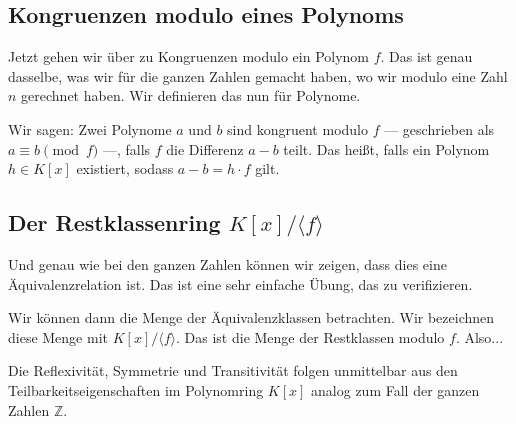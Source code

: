 \subsection{Kongruenzen modulo eines Polynoms}

\begin{spoken-clean}[00:39:47 - 00:42:42]
Jetzt gehen wir über zu Kongruenzen modulo ein Polynom $f$. Das ist genau dasselbe, was wir für die ganzen Zahlen gemacht haben, wo wir modulo eine Zahl $n$ gerechnet haben. Wir definieren das nun für Polynome. 

Wir sagen: Zwei Polynome $a$ und $b$ sind kongruent modulo $f$ --- geschrieben als $a \equiv b \pmod f$ ---, falls $f$ die Differenz $a - b$ teilt. Das heißt, falls ein Polynom $h \in K[x]$ existiert, sodass $a - b = h \cdot f$ gilt.
\end{spoken-clean}

\begin{math-stroke}
\end{math-stroke}

\subsection{Der Restklassenring \texorpdfstring{$K[x]/\langle f \rangle$}{K[x]/(f)}}

\begin{spoken-clean}[00:42:42 - 00:44:24]
Und genau wie bei den ganzen Zahlen können wir zeigen, dass dies eine Äquivalenzrelation ist. Das ist eine sehr einfache Übung, das zu verifizieren. 

Wir können dann die Menge der Äquivalenzklassen betrachten. Wir bezeichnen diese Menge mit $K[x]/\langle f \rangle$. Das ist die Menge der Restklassen modulo $f$. Also...
\end{spoken-clean}

\begin{math-stroke}

\begin{short-proof}
Die Reflexivität, Symmetrie und Transitivität folgen unmittelbar aus den Teilbarkeitseigenschaften im Polynomring $K[x]$ analog zum Fall der ganzen Zahlen $\mathbb{Z}$.
\end{short-proof}
\end{math-stroke}

